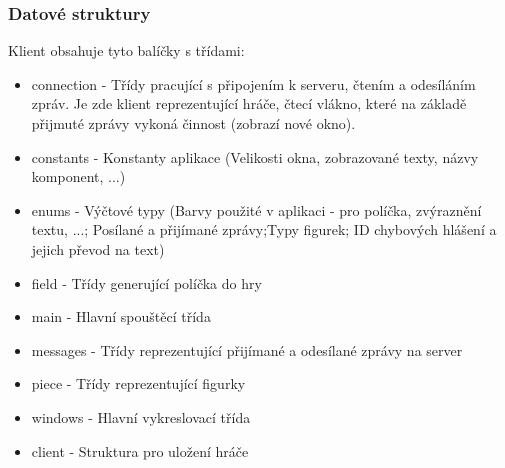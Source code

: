 \documentclass[12pt, a4paper]{article}
\begin{document}
\subsubsection{Datové struktury}
\label{Klient_Datové_struktury}
Klient obsahuje tyto balíčky s třídami:
\begin{itemize}
\item connection - Třídy pracující s připojením k serveru, čtením a odesíláním zpráv. Je zde klient reprezentující hráče, čtecí vlákno, které na základě přijmuté zprávy vykoná činnost (zobrazí nové okno).
\item constants - Konstanty aplikace (Velikosti okna, zobrazované texty, názvy komponent, ...)
\item enums - Výčtové typy (Barvy použité v aplikaci - pro políčka, zvýraznění textu, ...; Posílané a přijímané zprávy;Typy figurek; ID chybových hlášení a jejich převod na text)
\item field - Třídy generující políčka do hry
\item main -  Hlavní spouštěcí třída
\item messages - Třídy reprezentující přijímané a odesílané zprávy na server
\item piece - Třídy reprezentující figurky
\item windows - Hlavní vykreslovací třída 
\item client - Struktura pro uložení hráče
\end{itemize}
\end{document}
